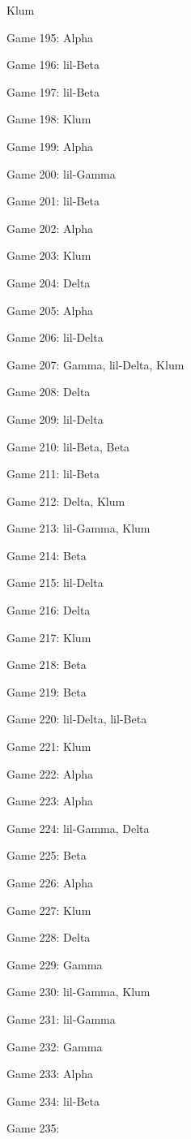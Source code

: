 \documentclass{article}
\begin{document}
\begin{multicols}{3}
\begin{compactitem}
Klum
\item Game 195:
Alpha
\item Game 196:
lil-Beta
\item Game 197:
lil-Beta
\item Game 198:
Klum
\item Game 199:
Alpha
\item Game 200:
lil-Gamma
\item Game 201:
lil-Beta
\item Game 202:
Alpha
\item Game 203:
Klum
\item Game 204:
Delta
\item Game 205:
Alpha
\item Game 206:
lil-Delta
\item Game 207:
Gamma, lil-Delta, Klum
\item Game 208:
Delta
\item Game 209:
lil-Delta
\item Game 210:
lil-Beta, Beta
\item Game 211:
lil-Beta
\item Game 212:
Delta, Klum
\item Game 213:
lil-Gamma, Klum
\item Game 214:
Beta
\item Game 215:
lil-Delta
\item Game 216:
Delta
\item Game 217:
Klum
\item Game 218:
Beta
\item Game 219:
Beta
\item Game 220:
lil-Delta, lil-Beta
\item Game 221:
Klum
\item Game 222:
Alpha
\item Game 223:
Alpha
\item Game 224:
lil-Gamma, Delta
\item Game 225:
Beta
\item Game 226:
Alpha
\item Game 227:
Klum
\item Game 228:
Delta
\item Game 229:
Gamma
\item Game 230:
lil-Gamma, Klum
\item Game 231:
lil-Gamma
\item Game 232:
Gamma
\item Game 233:
Alpha
\item Game 234:
lil-Beta
\item Game 235:

\end{compactitem}
\end{multicols}
\end{document}
